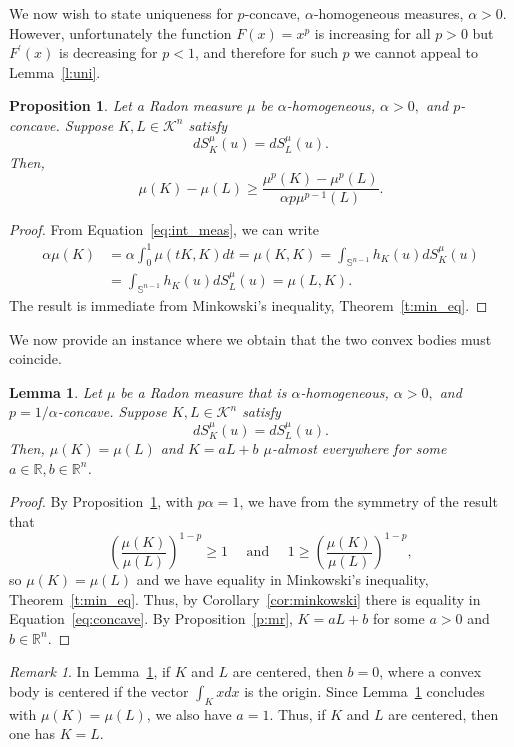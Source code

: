 \documentclass[11pt]{amsart}
\newtheorem{lemma}[theorem]{Lemma}
\newtheorem{proposition}[theorem]{Proposition}
\theoremstyle{definition}
\theoremstyle{remark}
\newtheorem{remark}[theorem]{Remark}
\numberwithin{equation}{section}
\newcommand{\R}{\mathbb{R}}
\newcommand{\s}{\mathbb{S}}
\newcommand{\conbod}{\mathcal{K}^n}
\begin{document}
We now wish to state uniqueness for $p$-concave, $\alpha$-homogeneous measures, $\alpha>0$. However, unfortunately the function $F(x)=x^p$ is increasing for all $p>0$ but $F^\prime(x)$ is decreasing for $p<1$, and therefore for such $p$ we cannot appeal to Lemma~\ref{l:uni}.

\begin{proposition}
\label{p:min_exist}
Let a Radon measure $\mu$ be $\alpha$-homogeneous, $\alpha>0,$ and $p$-concave. Suppose $K,L\in\conbod$ satisfy
$$dS^{\mu}_{K}(u)=dS^{\mu}_{L}(u).$$
Then, $$\mu(K)-\mu(L)\geq \frac{\mu^p(K)-\mu^p(L)}{\alpha p\mu^{p-1}(L)}.$$
\end{proposition}
\begin{proof}
From Equation~\ref{eq:int_meas}, we can write \begin{align*}\alpha\mu(K)&=\alpha\int_{0}^1\mu(tK,K)dt= \mu(K,K)=\int_{\s^{n-1}}h_K(u)dS^{\mu}_{K}(u)
\\
&= \int_{\s^{n-1}}h_K(u)dS^{\mu}_{L}(u)=\mu(L,K).\end{align*}
The result is immediate from Minkowski's inequality, Theorem~\ref{t:min_eq}.
\end{proof}
We now provide an instance where we obtain that the two convex bodies must coincide.
\begin{lemma}
\label{l:min_exist}
Let $\mu$ be a Radon measure that is $\alpha$-homogeneous, $\alpha>0,$ and $p=1/\alpha$-concave. Suppose $K,L\in\conbod$ satisfy
$$dS^{\mu}_{K}(u)=dS^{\mu}_{L}(u).$$
Then, $\mu(K)=\mu(L)$ and $K=aL +b$ $\mu$-almost everywhere for some $a\in\R, b\in\R^n$.
\end{lemma}
\begin{proof}
By Proposition~\ref{p:min_exist}, with $p\alpha=1$, we have from the symmetry of the result that
$$\left(\frac{\mu(K)}{\mu(L)}\right)^{1-p}\geq 1 \quad \text{ and } \quad 1\geq \left(\frac{\mu(K)}{\mu(L)}\right)^{1-p},$$
so $\mu(K)=\mu(L)$ and we have equality in Minkowski's inequality, Theorem~\ref{t:min_eq}. Thus, by Corollary~\ref{cor:minkowski} there is equality in Equation~\ref{eq:concave}. By Proposition~\ref{p:mr}, $K=aL + b$ for some $a>0$ and $b\in\R^n$.
\end{proof}
\begin{remark}
\label{r:min_exist}
In Lemma~\ref{l:min_exist}, if $K$ and $L$ are centered, then $b=0$, where a convex body is centered if the vector $\int_K x dx$ is the origin. Since Lemma~\ref{l:min_exist} concludes with $\mu(K)=\mu(L)$, we also have $a=1$. Thus, if $K$ and $L$ are centered, then one has $K=L$. \end{remark}
\end{document}
